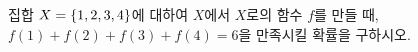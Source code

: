 집합 $X=\{1{,}\mkern3mu\mathopen{}2{,}\mkern3mu\mathopen{}3{,}\mkern3mu\mathopen{}4\}$에 대하여 $X$에서 $X$로의 함수 $f$를 만들 때, $f(1)+f(2)+f(3)+f(4)=6$을 만족시킬 확률을 구하시오.
